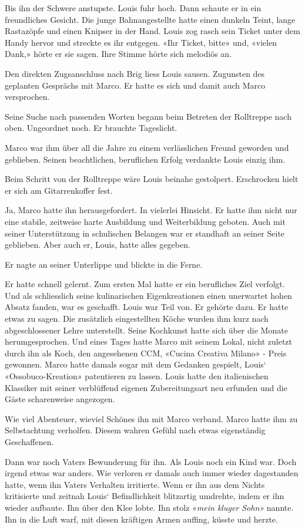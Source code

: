 Bis ihn der Schwere anstupste. Louis fuhr hoch. Dann schaute er in ein
freundliches Gesicht. Die junge Bahnangestellte hatte einen dunkeln
Teint, lange Rastazöpfe und einen Knipser in der Hand. Louis zog rasch
sein Ticket unter dem Handy hervor und streckte es ihr entgegen. «Ihr
Ticket, bitte» und, «vielen Dank,» hörte er sie sagen. Ihre Stimme hörte
sich melodiös an.

Den direkten Zugsanschluss nach Brig liess Louis sausen. Zugunsten des
geplanten Gesprächs mit Marco. Er hatte es sich und damit auch Marco
versprochen.

Seine Suche nach passenden Worten begann beim Betreten der Rolltreppe
nach oben. Ungeordnet noch. Er brauchte Tageslicht.

Marco war ihm über all die Jahre zu einem verlässlichen Freund geworden
und geblieben. Seinen beachtlichen, beruflichen Erfolg verdankte Louis
einzig ihm.

Beim Schritt von der Rolltreppe wäre Louis beinahe gestolpert.
Erschrocken hielt er sich am Gitarrenkoffer fest.

Ja, Marco hatte ihn herausgefordert. In vielerlei Hinsicht. Er hatte ihm
nicht nur eine stabile, zeitweise harte Ausbildung und Weiterbildung
geboten. Auch mit seiner Unterstützung in schulischen Belangen war er
standhaft an seiner Seite geblieben. Aber auch er, Louis, hatte alles
gegeben.

Er nagte an seiner Unterlippe und blickte in die Ferne.

Er hatte schnell gelernt. Zum ersten Mal hatte er ein berufliches Ziel
verfolgt. Und als schliesslich seine kulinarischen Eigenkreationen einen
unerwartet hohen Absatz fanden, war es geschafft. Louis war Teil von. Er
gehörte dazu. Er hatte etwas zu sagen. Die zusätzlich eingestellten
Köche wurden ihm kurz nach abgeschlossener Lehre unterstellt. Seine
Kochkunst hatte sich über die Monate herumgesprochen. Und eines Tages
hatte Marco mit seinem Lokal, nicht zuletzt durch ihn als Koch, den
angesehenen CCM, «Cucina Creativa Milano» - Preis gewonnen. Marco hatte
damals sogar mit dem Gedanken gespielt, Louis` «Ossobuco-Kreation»
patentieren zu lassen. Louis hatte den italienischen Klassiker mit
seiner verblüffend eigenen Zubereitungsart neu erfunden und die Gäste
scharenweise angezogen.

Wie viel Abenteuer, wieviel Schönes ihn mit Marco verband. Marco hatte
ihm zu Selbstachtung verholfen. Diesem wahren Gefühl nach etwas
eigenständig Geschaffenen.

Dann war noch Vaters Bewunderung für ihn. Als Louis noch ein Kind war.
Doch irgend etwas war anders. Wie verloren er damals auch immer wieder
dagestanden hatte, wenn ihn Vaters Verhalten irritierte. Wenn er ihn aus
dem Nichts kritisierte und zeitnah Louis` Befindlichkeit blitzartig
umdrehte, indem er ihn wieder aufbaute. Ihn über den Klee lobte. Ihn
stolz «\emph{mein kluger Sohn»} nannte. Ihn in die Luft warf, mit diesen
kräftigen Armen auffing, küsste und herzte.

